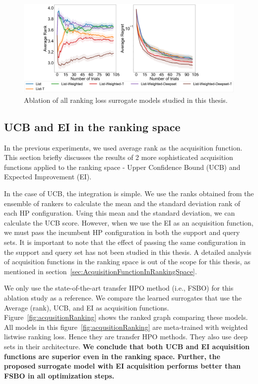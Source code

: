 \documentclass[12pt, twoside, ngerman]{report}
\begin{document}
\begin{figure}[h]
  \centering
    \includegraphics[scale=0.22]{images/FinalAblation}
    \caption{Ablation of all ranking loss surrogate models studied in this thesis.}
    \label{fig:FinalAblation}
\end{figure}

\subsection{UCB and EI in the ranking space}
In the previous experiments, we used average rank as the acquisition function. This section briefly discusses the results of 2 more sophisticated acquisition functions applied to the ranking space - Upper Confidence Bound (UCB) and Expected Improvement (EI).

In the case of UCB, the integration is simple. We use the ranks obtained from the ensemble of rankers to calculate the mean and the standard deviation rank of each HP configuration. Using this mean and the standard deviation, we can calculate the UCB score. However, when we use the EI as an acquisition function, we must pass the incumbent HP configuration in both the support and query sets. It is important to note that the effect of passing the same configuration in the support and query set has not been studied in this thesis. A detailed analysis of acquisition functions in the ranking space is out of the scope for this thesis, as mentioned in section~\ref{sec:AcquisitionFunctionInRankingSpace}.

We only use the state-of-the-art transfer HPO method (i.e., FSBO) for this ablation study as a reference. We compare the learned surrogates that use the Average (rank), UCB, and EI as acquisition functions.
Figure~\ref{fig:acqusitionRanking} shows the ranked graph comparing these models.
All models in this figure~\ref{fig:acqusitionRanking} are meta-trained with weighted listwise ranking loss. Hence they are transfer HPO methods. They also use deep sets in their architecture.
\textbf{We conclude that both UCB and EI acquisition functions are superior even in the ranking space. Further, the proposed surrogate model with EI  acquisition performs better than FSBO in all optimization steps.}
\end{document}
